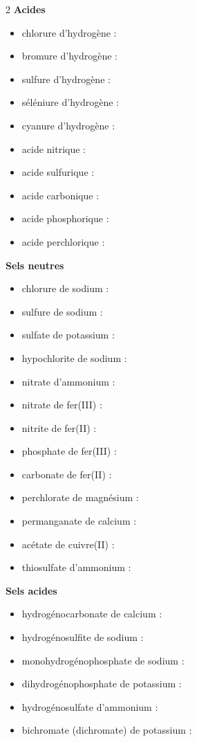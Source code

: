 \documentclass[11pt,a4paper]{article}
\begin{document}
\begin{multicols}{2}
\textbf{\textcolor{oxycol}{Acides}}
\begin{itemize}
  \item chlorure d'hydrogène : 
  \item bromure d'hydrogène : 
  \item sulfure d'hydrogène : 
  \item séléniure d'hydrogène : 
  \item cyanure d'hydrogène : 
  \item acide nitrique : 
  \item acide sulfurique : 
  \item acide carbonique : 
  \item acide phosphorique : 
  \item acide perchlorique : 
\end{itemize}

\textbf{\textcolor{saltcol}{Sels neutres}}
\begin{itemize}
  \item chlorure de sodium : 
  \item sulfure de sodium : 
  \item sulfate de potassium : 
  \item hypochlorite de sodium : 
  \item nitrate d'ammonium : 
  \item nitrate de fer(III) : 
  \item nitrite de fer(II) : 
  \item phosphate de fer(III) : 
  \item carbonate de fer(II) : 
  \item perchlorate de magnésium : 
  \item permanganate de calcium : 
  \item acétate de cuivre(II) : 
  \item thiosulfate d'ammonium : 
\end{itemize}

\textbf{\textcolor{saltcol}{Sels acides}}
\begin{itemize}
  \item hydrogénocarbonate de calcium : 
  \item hydrogénosulfite de sodium : 
  \item monohydrogénophosphate de sodium : 
  \item dihydrogénophosphate de potassium : 
  \item hydrogénosulfate d'ammonium : 
  \item bichromate (dichromate) de potassium : 
\end{itemize}


\end{multicols}
\end{document}
